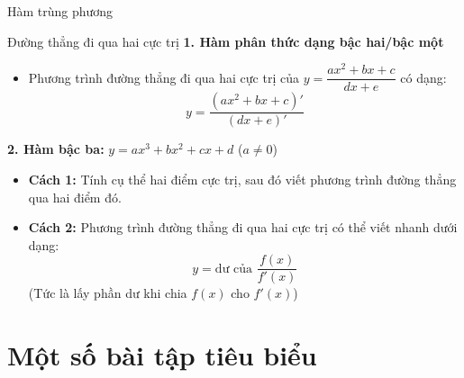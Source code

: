 \begin{lythuyetbox}{Hàm trùng phương}
\begin{center}
\end{center}

\end{lythuyetbox}

\begin{lythuyetbox}{Đường thẳng đi qua hai cực trị}
\textbf{1. Hàm phân thức dạng bậc hai/bậc một}

\begin{itemize}
    \item Phương trình đường thẳng đi qua hai cực trị của $y = \dfrac{ax^2+bx+c}{dx+e}$ có dạng:
    \[
        y = \frac{(ax^2+bx+c)'}{(dx+e)'}
    \]
\end{itemize}

\textbf{2. Hàm bậc ba:} $y = ax^3 + bx^2 + cx + d$ ($a \neq 0$)

\begin{itemize}
    \item \textbf{Cách 1:} Tính cụ thể hai điểm cực trị, sau đó viết phương trình đường thẳng qua hai điểm đó.
    \item \textbf{Cách 2:} Phương trình đường thẳng đi qua hai cực trị có thể viết nhanh dưới dạng:
    \[
        y = \text{dư của } \frac{f(x)}{f'(x)}
    \]
    (Tức là lấy phần dư khi chia $f(x)$ cho $f'(x)$)
\end{itemize}
\end{lythuyetbox}

\section{Một số bài tập tiêu biểu}

